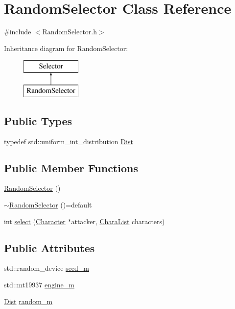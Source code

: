 \hypertarget{class_random_selector}{}\section{Random\+Selector Class Reference}
\label{class_random_selector}


{\ttfamily \#include $<$Random\+Selector.\+h$>$}

Inheritance diagram for Random\+Selector\+:\begin{figure}[H]
\begin{center}
\leavevmode
\includegraphics[height=2.000000cm]{class_random_selector}
\end{center}
\end{figure}
\subsection*{Public Types}
\begin{DoxyCompactItemize}
\item 
typedef std\+::uniform\+\_\+int\+\_\+distribution \hyperlink{class_random_selector_aa19efc61b8b330971db574f39e4f623b}{Dist}
\end{DoxyCompactItemize}
\subsection*{Public Member Functions}
\begin{DoxyCompactItemize}
\item 
\hyperlink{class_random_selector_a9711b846989394963835acfd4da8b7aa}{Random\+Selector} ()
\item 
\hyperlink{class_random_selector_a19c6e54d2055c7e317c128e1d8c72ffe}{$\sim$\+Random\+Selector} ()=default
\item 
int \hyperlink{class_random_selector_ab5d7b7d795cdae3f329484c1d305e9e1}{select} (\hyperlink{class_character}{Character} $\ast$attacker, \hyperlink{_character_8h_ac22f543a628d2695d0297c399b0272d8}{Chara\+List} characters)
\end{DoxyCompactItemize}
\subsection*{Public Attributes}
\begin{DoxyCompactItemize}
\item 
std\+::random\+\_\+device \hyperlink{class_random_selector_a0d02d545b4b26df31510b9ab238bbc0c}{seed\+\_\+m}
\item 
std\+::mt19937 \hyperlink{class_random_selector_a141cf5ff4752ece62b71a880501601b3}{engine\+\_\+m}
\item 
\hyperlink{class_random_selector_aa19efc61b8b330971db574f39e4f623b}{Dist} \hyperlink{class_random_selector_adbb8b79d964616048efb5554da2eb561}{random\+\_\+m}
\end{DoxyCompactItemize}


